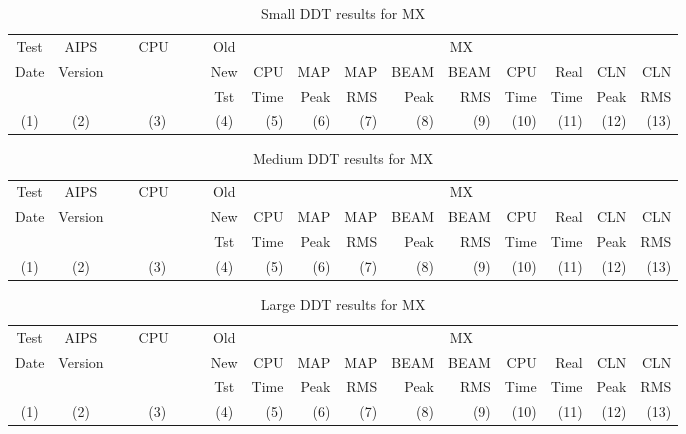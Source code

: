 \begin{table}[h]
\begin{center}
\begin{tabular}{cccc|rrrrrrrrr}
\hline \hline
Test      &  AIPS    &~~~CPU~~~~& Old  &  \multicolumn{9}{c}{MX}  \\
  Date    & Version  &          & New  &   CPU    &   MAP &
    MAP   &   BEAM   & BEAM &  CPU     &  Real    &   CLN & CLN \\
          &          &          & Tst  &  Time    &   Peak    &    RMS
&   Peak    &    RMS&Time & Time & Peak   & RMS \\
  (1)     &   (2)    &  (3)     & (4)  & (5)      &   (6)     &   (7)
&   (8)     &    (9)&(10)&  (11)  & (12)  & (13) \\
\hline

\hline\hline
\end{tabular}
\end{center}
\caption{Small DDT results for MX}
\end{table}
\clearpage

\begin{table}[h]
\begin{center}
\begin{tabular}{cccc|rrrrrrrrr}
\hline \hline
Test      &  AIPS    &~~~CPU~~~~& Old  &  \multicolumn{9}{c}{MX}  \\
  Date    & Version  &          & New  &   CPU    &   MAP &
    MAP   &   BEAM   & BEAM &  CPU     &  Real    &   CLN & CLN \\
          &          &          & Tst  &  Time    &   Peak    &    RMS
&   Peak    &    RMS&Time & Time & Peak   & RMS \\
  (1)     &   (2)    &  (3)     & (4)  & (5)      &   (6)     &   (7)
&   (8)     &    (9)&(10)&  (11)  & (12)  & (13) \\
\hline

\hline \hline
\end{tabular}
\end{center}
\caption{Medium DDT results for MX}
\end{table}

\begin{table}[h]
\begin{center}
\begin{tabular}{cccc|rrrrrrrrr}
\hline \hline
Test      &  AIPS    &~~~CPU~~~~& Old  &  \multicolumn{9}{c}{MX}  \\
  Date    & Version  &          & New  &   CPU    &   MAP &
    MAP   &   BEAM   & BEAM &  CPU     &  Real    &   CLN & CLN \\
          &          &          & Tst  &  Time    &   Peak    &    RMS
&   Peak    &    RMS&Time & Time & Peak   & RMS \\
  (1)     &   (2)    &  (3)     & (4)  & (5)      &   (6)     &   (7)
&   (8)     &    (9)&(10)&  (11)  & (12)  & (13) \\
\hline

\hline \hline
\end{tabular}
\end{center}
\caption{Large DDT results for MX}
\end{table}

